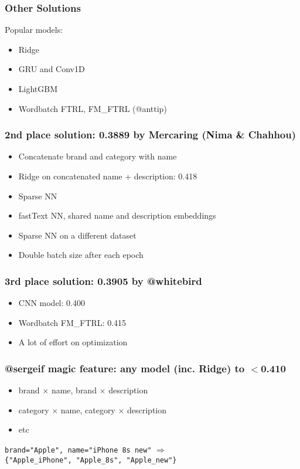 
\begin{frame}
    \frametitle{Other Solutions}
    Popular models:
    \begin{itemize}
        \item Ridge
        \item GRU and Conv1D
        \item LightGBM
        \item Wordbatch FTRL, FM\_FTRL (@anttip)
    \end{itemize}
\end{frame}

\begin{frame}
    \frametitle{2nd place solution: 0.3889 by Mercaring (Nima \& Chahhou)}
    \begin{itemize}
        \item Concatenate brand and category with name
        \item Ridge on concatenated name + description: 0.418
        \item Sparse NN
        \item fastText NN, shared name and description embeddings
        \item Sparse NN on a different dataset
        \item Double batch size after each epoch
    \end{itemize}
\end{frame}

\begin{frame}
    \frametitle{3rd place solution: 0.3905 by @whitebird}
    \begin{itemize}
        \item CNN model: 0.400
        \item Wordbatch FM\_FTRL: 0.415
        \item A lot of effort on optimization
    \end{itemize}
\end{frame}

\begin{frame}
    \frametitle{@sergeif magic feature: any model (inc. Ridge) to $<$0.410}
    \begin{itemize}
        \item brand $\times$ name, brand $\times$ description
        \item category $\times$ name, category $\times$ description
        \item etc \textellipsis
    \end{itemize}

    \texttt{brand="Apple", name="iPhone 8s new"}
    $\Rightarrow$ \\
    \texttt{\{"Apple\_iPhone", "Apple\_8s", "Apple\_new"\}}

\end{frame}

